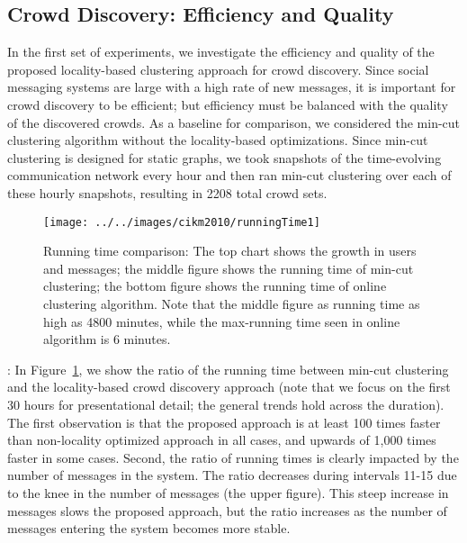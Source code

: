 \documentclass{sig-alternate}
\begin{document}
\subsection{Crowd Discovery: Efficiency and Quality}
In the first set of experiments, we investigate the efficiency and quality of
the proposed locality-based clustering approach for crowd discovery. Since social messaging systems are large
with a high rate of new messages, it is important for crowd discovery to be
efficient; but efficiency must be balanced with the quality of the discovered
crowds. As a baseline for comparison, we considered the min-cut clustering
algorithm \cite{flake:cut-clustering} without the locality-based optimizations. Since min-cut clustering is designed for
static graphs, we took snapshots of the time-evolving communication network every
hour and then ran min-cut clustering over each of these hourly snapshots,
resulting in 2208 total crowd sets.

\begin{figure}[!t]
\begin{center}
\texttt{[image: ../../images/cikm2010/runningTime1]}
\caption{Running time comparison: The top chart shows the growth in users and
messages; the middle figure shows the running time of min-cut clustering;
the bottom figure shows the running time of online clustering algorithm. Note
that the middle figure as running time as high as 4800 minutes, while the
max-running time seen in online algorithm is 6 minutes.}
\label{fig:running-time}
\end{center}
\end{figure}



\medskip
{}: In Figure~\ref{fig:running-time}, we
show the ratio of the running time between min-cut clustering and the locality-based crowd
discovery approach (note that we focus on the first 30 hours for presentational
detail; the general trends hold across the duration). The first observation is
that the proposed approach is at least 100 times faster than non-locality optimized approach
in all cases, and upwards of 1,000 times faster in some cases.  Second, the ratio
of running times is clearly impacted by the number of messages in the system. The
ratio decreases during intervals 11-15 due to the knee in the number of messages
(the upper figure). This steep increase in messages slows the proposed approach,
but the ratio increases as the number of messages entering the system becomes
more stable.
\end{document}
